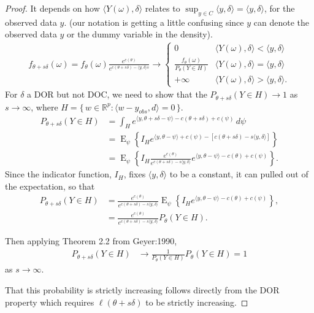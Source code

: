 \documentclass{amsbook}
\DeclareMathOperator{\E}{E}
\def\RR{{\mathbb R}}
\newcommand{\set}[1]{\{\,#1\,\}}
\newcommand{\inner}[1]{\langle #1 \rangle}
\theoremstyle{definition}
\theoremstyle{remark}
\begin{document}
\begin{proof}
It depends on how $\inner{Y(\omega),\delta}$ relates to $\sup_{y \in C}\inner{y,
\delta} = \inner{y,\delta}$, for the observed data $y$.  (our notation is getting a 
little confusing since $y$ can denote the observed data $y$ or the dummy variable in 
the density).  
\begin{align*}
	f_{\theta+s\delta}(\omega) = f_\theta(\omega) \frac{e^{c(\theta)}}{e^{ c(\theta+s
\delta) - \inner{y,\delta}s } } 
	\to	
			\begin{cases} 
			0 								& \inner{Y(\omega),\delta} < \inner{y,
\delta} \\
			\frac{f_\theta(\omega)}{P_\theta(Y \in H)} 	& \inner{Y(\omega) ,
\delta} = \inner{y,\delta} \\
			+\infty							& \inner{Y(\omega),\delta} > \inner{y,
\delta}.
	\end{cases}
\end{align*}
For $\delta$ a DOR but not DOC, we need to show that the $P_{\theta+s\delta}(Y \in H) 
\to 1$ 
as $s \to \infty$, where $H = \set{w \in \RR^p: \inner{w-y_{obs},d}=0}$.
\begin{align*}
 P_{\theta+s\delta}(Y \in H) &= \int_H e^{\inner{y, \theta+s\delta - \psi} - c(\theta
+s\delta) + c(\psi)} \, d\psi \\
		&= \E_\psi \left \{ I_H e^{\inner{y, \theta - \psi} +c(\psi) - [c(\theta+s
\delta) -s\inner{y,\delta}]} \right 
\}\\
		&= \E_\psi \left \{ I_H  \frac{e^{c(\theta)} }{ e^{ c(\theta+s\delta) -s\inner
{y,\delta} } } 
		e^{\inner{y, \theta - \psi} -c(\theta)+c(\psi)}  \right \}.
\end{align*}
Since the indicator function, $I_H$, fixes $\inner{ y, \delta}$ to be a constant, it 
can pulled out of the expectation, so that 
\begin{align*}
		 P_{\theta+s\delta}(Y \in H)
		 &= \frac{e^{c(\theta)} }{ e^{ c(\theta+s\delta) -s\inner{y,\delta} } }
		 \E_\psi \left \{ I_H   
		e^{\inner{y, \theta - \psi} -c(\theta)+c(\psi)}  \right \}, \\
		 &= \frac{e^{c(\theta)} }{ e^{ c(\theta+s\delta) -s\inner{y,\delta} } } 
		 P_\theta ( Y \in H ).
		 \end{align*}
 
Then applying Theorem 2.2 from Geyer:1990,
\begin{align*}
 P_{\theta+s\delta}(Y \in H)
		&\to \frac{1}{P_\theta(Y \in H)}  P_{\theta}(Y \in H) = 1
 \end{align*}
 as $s \to \infty$.  
 
 That this probability is strictly increasing follows directly from the DOR property 
which requires $\ell( \theta+s
\delta)$ to be strictly increasing.   
\end{proof}
\end{document}
